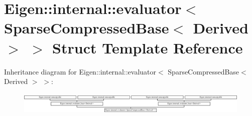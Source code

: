 \hypertarget{struct_eigen_1_1internal_1_1evaluator_3_01_sparse_compressed_base_3_01_derived_01_4_01_4}{}\section{Eigen\+:\+:internal\+:\+:evaluator$<$ Sparse\+Compressed\+Base$<$ Derived $>$ $>$ Struct Template Reference}
\label{struct_eigen_1_1internal_1_1evaluator_3_01_sparse_compressed_base_3_01_derived_01_4_01_4}
Inheritance diagram for Eigen\+:\+:internal\+:\+:evaluator$<$ Sparse\+Compressed\+Base$<$ Derived $>$ $>$\+:\begin{figure}[H]
\begin{center}
\leavevmode
\includegraphics[height=1.076923cm]{struct_eigen_1_1internal_1_1evaluator_3_01_sparse_compressed_base_3_01_derived_01_4_01_4}
\end{center}
\end{figure}
